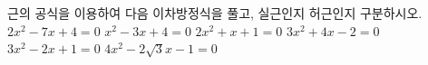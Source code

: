 근의 공식을 이용하여 다음 이차방정식을 풀고, 실근인지 허근인지 구분하시오.
 $2x^2-7x+4=0$
 $x^2-3x+4=0$
 $2x^2+x+1=0$
 $3x^2+4x-2=0$
 $3x^2-2x+1=0$
 $4x^2-2\sqrt{3}x-1=0$
